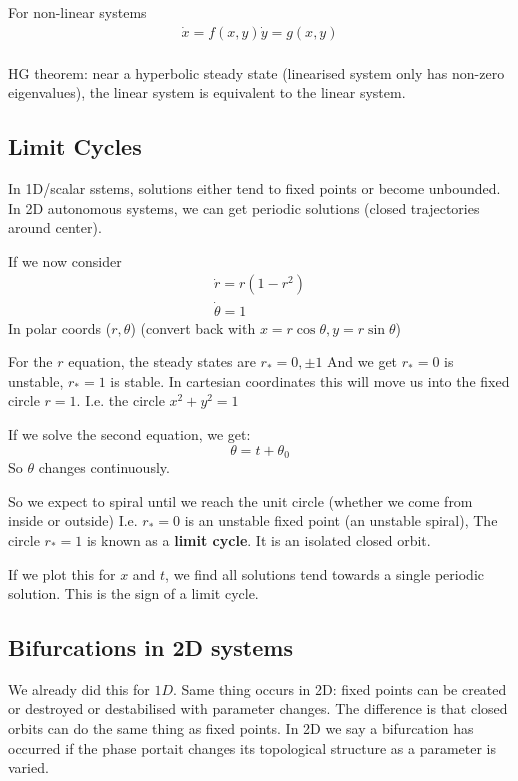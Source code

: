 \documentclass{/home/janmebows/Documents/LatexTemplates/myassignment}
\begin{document}
For non-linear systems
\begin{align*}
    \dot{x} = f(x,y)
    \dot{y} = g(x,y)\\
\end{align*}

HG theorem: near a hyperbolic steady state (linearised system only has non-zero eigenvalues), the linear system is equivalent to the linear system.



\subsection{Limit Cycles}
In 1D/scalar sstems, solutions either tend to fixed points or become unbounded.\\
In 2D autonomous systems, we can get periodic solutions (closed trajectories around center).

If we now consider
\begin{align*}
    \dot{r} = r(1-r^2)\\
    \dot{\theta} = 1
\end{align*}
In polar coords ($r,\theta$) (convert back with $x = r\cos\theta, y= r\sin \theta$)

For the $r$ equation, the steady states are $r_* = 0,\pm1 $
And we get $r_* = 0$ is unstable, $r_* = 1$ is stable.
In cartesian coordinates this will move us into the fixed circle $r=1$. I.e. the circle $x^2 + y^2 = 1$

If we solve the second equation, we get:
\[\theta = t + \theta_0\]
So $\theta$ changes continuously.

So we expect to spiral until we reach the unit circle (whether we come from inside or outside)
I.e. $r_* =0$ is an unstable fixed point (an unstable spiral), 
The circle $r_*=1$ is known as a \textbf{limit cycle}. It is an isolated closed orbit.


If we plot this for $x$ and $t$, we find all solutions tend towards a single periodic solution. This is the sign of a limit cycle.


\subsection{Bifurcations in 2D systems}
We already did this for $1D$. Same thing occurs in 2D: fixed points can be created or destroyed or destabilised with parameter changes. The difference is that closed orbits can do the same thing as fixed points. In 2D we say a bifurcation has occurred if the phase portait changes its topological structure as a parameter is varied. 
\end{document}
